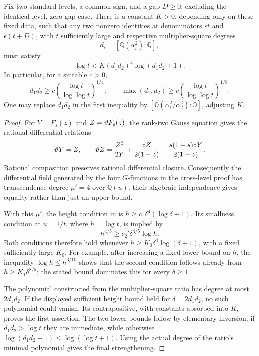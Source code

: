 \begin{proposition}
\label{prop:C-paired-degree-growth}
Fix two standard levels, a common sign, and a gap $D\geq0$,
excluding the identical-level, zero-gap case.  There is a constant
$K>0$, depending only on these fixed data, such that any two
nonzero identities at denominators $\epsilon t$ and
$\epsilon(t+D)$, with $t$ sufficiently large and respective
multiplier-square degrees
\[
 d_i=[\mathbb Q(\alpha_i^2):\mathbb Q],
\]
must satisfy
\[
 \log t<K(d_1d_2)^4\log(d_1d_2+1).
\]
In particular, for a suitable $c>0$,
\[
 d_1d_2\geq c\left(\frac{\log t}{\log\log t}\right)^{1/4},
 \qquad
 \max(d_1,d_2)\geq c
       \left(\frac{\log t}{\log\log t}\right)^{1/8}.
\]
One may replace $d_1d_2$ in the first inequality by
$[\mathbb Q(\alpha_1^2/\alpha_2^2):\mathbb Q]$, adjusting $K$.
\end{proposition}

\begin{proof}
For $Y=F_s(z)$ and $Z=\vartheta F_s(z)$, the rank-two Gauss equation
gives the rational differential relations
\[
 \vartheta Y=Z,\qquad
 \vartheta Z=\frac{Z^2}{2Y}
             +\frac{zZ}{2(1-z)}
             +\frac{s(1-s)zY}{2(1-z)}.
\]
Rational composition preserves rational differential closure.
Consequently the differential field generated by the four
$G$-functions in the cross-level proof has transcendence degree
$\mu'=4$ over $\mathbb Q(u)$; their algebraic independence gives
equality rather than just an upper bound.

With this $\mu'$, the height condition in
\cite[Theorem~3.13, (3.5)]{BaldiBinyaminiUrbanik2026} is
$h\geq c_1\delta^4(\log\delta+1)$.  Its smallness condition at
$u=1/t$, where $h=\log t$, is implied by
\[
 h^{4/5}\geq c_2'\delta^{4/5}\log h.
\]
Both conditions therefore hold whenever
$h\geq K_0\delta^4\log(\delta+1)$, with a fixed sufficiently
large $K_0$.  For example, after increasing a fixed lower bound
on $h$, the inequality $\log h\leq h^{3/10}$ shows that the
second condition follows already from
$h\geq K_1\delta^{8/5}$; the stated bound dominates this for
every $\delta\geq1$.

The polynomial constructed from the multiplier-square ratio has
degree at most $2d_1d_2$.  If the displayed sufficient height bound
held for $\delta=2d_1d_2$, no such polynomial could vanish.
Its contrapositive, with constants absorbed into $K$, proves the
first assertion.  The two lower bounds follow by elementary
inversion; if $d_1d_2>\log t$ they are immediate, while otherwise
$\log(d_1d_2+1)\leq\log(\log t+1)$.  Using the actual degree of
the ratio's minimal polynomial gives the final strengthening.
\end{proof}

